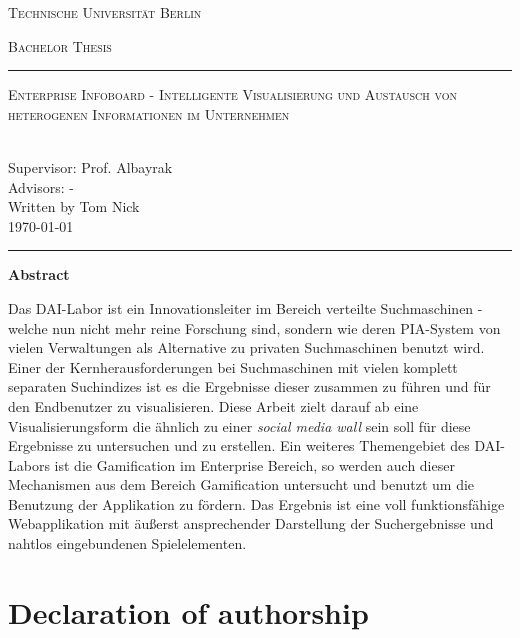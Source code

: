 \documentclass[12pt,twoside]{book}
\renewcommand{\title}{Enterprise Infoboard - Intelligente Visualisierung und Austausch von heterogenen Informationen im Unternehmen}
\renewcommand{\author}{Tom Nick}
\newcommand\blankpage{%
    \null
    \thispagestyle{empty}%
    \addtocounter{page}{-1}%
    \newpage}
\begin{document}
\begin{titlepage}
\begin{center}
{\Huge \textsc{Technische Universität Berlin}}
{\fontsize{2.5cm}{2cm}\selectfont \textsc{Bachelor Thesis}\par}
\vspace{1cm}
\hrule
\vspace{0.3cm}
{\Huge \textsc{\title{}}\par}
~\\[0.1cm]
{\Large Supervisor: Prof. Albayrak}\\[0.1cm]
{\Large Advisors: -}\\[0.3cm]
{\Large Written by \author{}}\\[0.1cm]
{\Large \today}
\vspace{0.55cm}
\hrule
\end{center}
\vfill
\begin{center}{\Large\textbf{Abstract}}\end{center}

Das DAI-Labor ist ein Innovationsleiter im Bereich verteilte Suchmaschinen - welche nun nicht mehr reine Forschung sind, sondern wie deren PIA-System von vielen Verwaltungen als Alternative zu privaten Suchmaschinen benutzt wird. Einer der Kernherausforderungen bei Suchmaschinen mit vielen komplett separaten Suchindizes ist es die Ergebnisse dieser zusammen zu führen und für den Endbenutzer zu visualisieren. Diese Arbeit zielt darauf ab eine Visualisierungsform die ähnlich zu einer \textit{social media wall} sein soll für diese Ergebnisse zu untersuchen und zu erstellen.
Ein weiteres Themengebiet des DAI-Labors ist die Gamification im Enterprise Bereich, so werden auch dieser Mechanismen aus dem Bereich Gamification untersucht und benutzt um die Benutzung der Applikation zu fördern. Das Ergebnis ist eine voll funktionsfähige Webapplikation mit äußerst ansprechender Darstellung der Suchergebnisse und nahtlos eingebundenen Spielelementen.

\end{titlepage}



\chapter*{Declaration of authorship}
\end{document}
